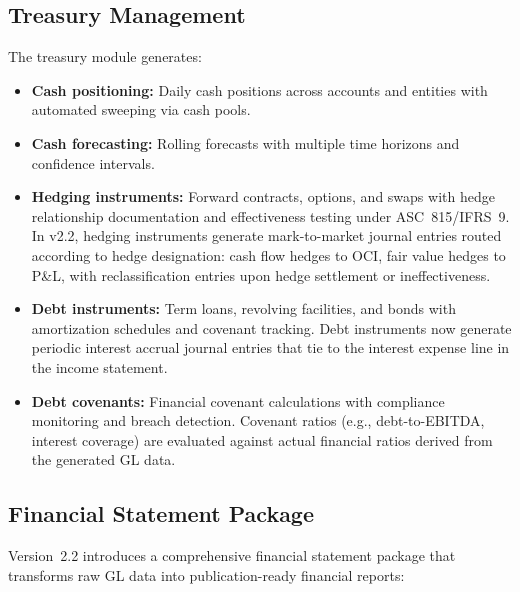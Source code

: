 \subsection{Treasury Management}
\label{sec:gen_treasury}

The treasury module generates:

\begin{itemize}
  \item \textbf{Cash positioning:} Daily cash positions across accounts
    and entities with automated sweeping via cash pools.
  \item \textbf{Cash forecasting:} Rolling forecasts with multiple
    time horizons and confidence intervals.
  \item \textbf{Hedging instruments:} Forward contracts, options, and
    swaps with hedge relationship documentation and effectiveness
    testing under ASC~815/IFRS~9.  In v2.2, hedging instruments
    generate mark-to-market journal entries routed according to hedge
    designation: cash flow hedges to OCI, fair value hedges to P\&L,
    with reclassification entries upon hedge settlement or
    ineffectiveness.
  \item \textbf{Debt instruments:} Term loans, revolving facilities, and
    bonds with amortization schedules and covenant tracking.  Debt
    instruments now generate periodic interest accrual journal entries
    that tie to the interest expense line in the income statement.
  \item \textbf{Debt covenants:} Financial covenant calculations with
    compliance monitoring and breach detection.  Covenant ratios
    (e.g., debt-to-EBITDA, interest coverage) are evaluated against
    actual financial ratios derived from the generated GL data.
\end{itemize}

\subsection{Financial Statement Package}
\label{sec:gen_finstmt}

Version~2.2 introduces a comprehensive financial statement package that
transforms raw GL data into publication-ready financial reports:

